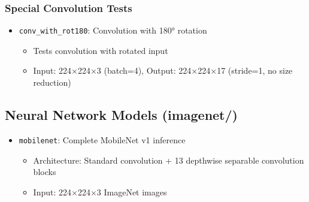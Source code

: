 \subsubsection{Special Convolution Tests}
\begin{itemize}
\item \texttt{conv\_with\_rot180}: Convolution with 180° rotation
  \begin{itemize}
  \item Tests convolution with rotated input
  \item Input: 224$\times$224$\times$3 (batch=4), Output: 224$\times$224$\times$17 (stride=1, no size reduction)
  \end{itemize}
\end{itemize}

\subsection{Neural Network Models (imagenet/)}
\begin{itemize}
\item \texttt{mobilenet}: Complete MobileNet v1 inference
  \begin{itemize}
  \item Architecture: Standard convolution + 13 depthwise separable convolution blocks
  \item Input: 224$\times$224$\times$3 ImageNet images
  \end{itemize}
\end{itemize}

